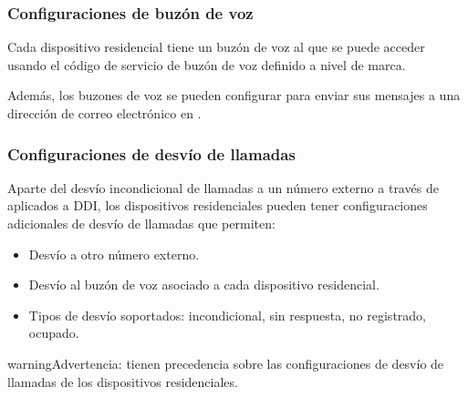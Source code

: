 \documentclass[letterpaper,10pt,spanish]{sphinxmanual}
\begin{document}
\subsubsection{Configuraciones de buzón de voz}
\label{administration_portal/client/residential/residential_devices:voicemail-settings}
Cada dispositivo residencial tiene un buzón de voz al que se puede acceder usando el código de servicio de buzón de voz definido a nivel de marca.

Además, los buzones de voz se pueden configurar para enviar sus mensajes a una dirección de correo electrónico en {\hyperref[administration_portal/client/residential/residential_voicemails:residential\string-voicemails]{}}.


\subsubsection{Configuraciones de desvío de llamadas}
\label{administration_portal/client/residential/residential_devices:residential-devices-cfw}\label{administration_portal/client/residential/residential_devices:call-forwarding-settings}
Aparte del desvío incondicional de llamadas a un número externo a través de {\hyperref[administration_portal/client/vpbx/routing_tools/external_call_filters:external\string-call\string-filters]{}} aplicados a DDI, los dispositivos residenciales pueden tener configuraciones adicionales de desvío de llamadas que permiten:
\begin{itemize}
\item {} 
Desvío a otro número externo.

\item {} 
Desvío al buzón de voz asociado a cada dispositivo residencial.

\item {} 
Tipos de desvío soportados: incondicional, sin respuesta, no registrado, ocupado.

\end{itemize}

\begin{notice}{warning}{Advertencia:}
{\hyperref[administration_portal/client/vpbx/routing_tools/external_call_filters:external\string-call\string-filters]{}} tienen precedencia sobre las configuraciones de desvío de llamadas de los dispositivos residenciales.
\end{notice}
\end{document}
